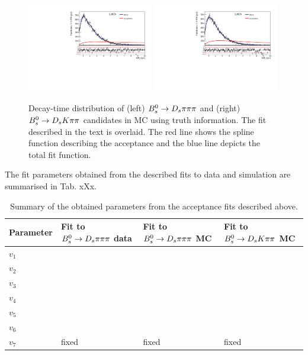 \begin{figure}[h]
\includegraphics[height=7.cm,width=0.49\textwidth]{figs/SplineAcc_MCFit_combined_trueCT_Norm.pdf}
\includegraphics[height=7.cm,width=0.49\textwidth]{figs/SplineAcc_MCFit_combined_trueCT_Sig.pdf}
\caption{Decay-time distribution of (left) ${{B}^0_{s}}\rightarrow{\ensuremath{{D}_{s}}}{\ensuremath{\pi}}{\ensuremath{\pi}}{\ensuremath{\pi}}$ and (right) ${{B}^0_{s}}\rightarrow{\ensuremath{{D}_{s}}}{\ensuremath{K}}{\ensuremath{\pi}}{\ensuremath{\pi}}$ candidates in MC using truth information. The fit described in the text is overlaid.
The red line shows the spline function describing the acceptance and the blue line depicts the total fit function.}
\label{fig:AccFit_MC}
\end{figure}

The fit parameters obtained from the described fits to data and simulation are summarised in Tab. xXx.



\begin{table}[h]
\centering
 \begin{tabular}{l l l l}
Parameter & Fit to ${{B}^0_{s}}\rightarrow{\ensuremath{{D}_{s}}}{\ensuremath{\pi}}{\ensuremath{\pi}}{\ensuremath{\pi}}$ data & Fit to ${{B}^0_{s}}\rightarrow{\ensuremath{{D}_{s}}}{\ensuremath{\pi}}{\ensuremath{\pi}}{\ensuremath{\pi}}$ MC & Fit to ${{B}^0_{s}}\rightarrow{\ensuremath{{D}_{s}}}{\ensuremath{K}}{\ensuremath{\pi}}{\ensuremath{\pi}}$ MC \\
\hline
$v_{1}$ & & & \\
$v_{2}$ & & & \\
$v_{3}$ & & & \\
$v_{4}$ & & & \\
$v_{5}$ & & & \\
$v_{6}$ & & & \\
$v_{7}$ & fixed & fixed & fixed\\
\end{tabular}
\caption{Summary of the obtained parameters from the acceptance fits described above.}
\label{table:InputVars}
\end{table}








